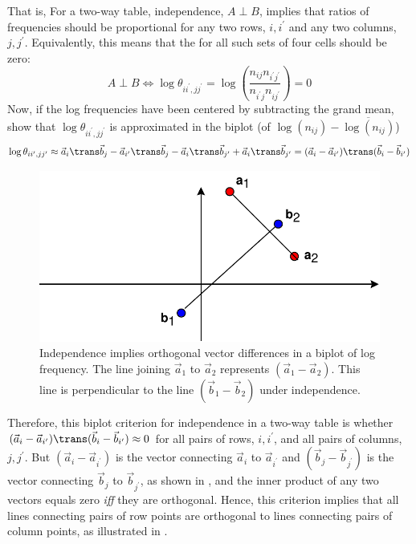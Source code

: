 \documentclass[11pt]{book}
\begin{document}
That is, For a two-way table, independence, $ A \perp B$,
implies that ratios of frequencies should be proportional for any
two rows, $i, i^{\prime}$ and any two columns, $j, j^{\prime}$.
Equivalently, this means that
the  for all such sets of four cells should
be zero:
\begin{equation*}
A \perp B \iff \log \theta_{i i^{\prime}, j j^{\prime}} = \log \left( \frac{n_{ij} n_{i^{\prime} j^{\prime}}} {n_{i^{\prime} j}  n_{ij^{\prime}}} \right) = 0
\end{equation*}
Now, if the log frequencies have been
centered by subtracting the grand mean,
\citet{Gabriel-etal:97} show that $\log \theta_{i i^{\prime}, j j^{\prime}}$
is approximated in the biplot (of $\log(n_{ij}) - \overline{ \log(n_{ij}) }$)
\begin{equation*}
\log \theta_{i i^{\prime}, j j^{\prime}} \approx
\vec{a}_i \trans \vec{b}_j - \vec{a}_{i^{\prime}} \trans \vec{b}_j -
\vec{a}_i \trans \vec{b}_{j^{\prime}} + \vec{a}_i \trans \vec{b}_{j^{\prime}}
= ( \vec{a}_i - \vec{a}_{i^{\prime}} )\trans ( \vec{b}_i - \vec{b}_{i^{\prime}} )
\end{equation*}

\begin{figure}[htb]
  \centering
  \includegraphics[width=.8\textwidth]{ch06/fig/bidemo}
  \caption[Independence implies orthogonal vector differences in a biplot of log frequency]{Independence implies orthogonal vector differences in a biplot of log frequency.  The line joining $\vec{a}_1$ to $\vec{a}_2$ represents
 $(\vec{a}_1 - \vec{a}_2)$.  This line is perpendicular to the line
 $(\vec{b}_1 - \vec{b}_2)$ under independence.}  \label{fig:bidemo}
\end{figure}

Therefore, this biplot criterion for independence in a two-way table
is whether 
\(  ( \vec{a}_i - \vec{a}_{i^{\prime}} )\trans ( \vec{b}_i - \vec{b}_{i^{\prime}} ) \approx 0\) for all pairs of rows, $i, i^{\prime}$,
and all pairs of columns, $j, j^{\prime}$.
But \( ( \vec{a}_i - \vec{a}_{i^{\prime}} ) \) is the vector connecting
$\vec{a}_i$ to $\vec{a}_{i^{\prime}}$ and
 \( ( \vec{b}_j - \vec{b}_{j^{\prime}} ) \) is the vector connecting
$\vec{b}_j$ to $\vec{b}_{j^{\prime}}$, as shown in ,
and the inner product of any two vectors equals zero \emph{iff} they
are orthogonal.
Hence, this criterion implies that all
lines connecting pairs of row points are orthogonal to lines connecting
pairs of column points, as illustrated in .
\end{document}
